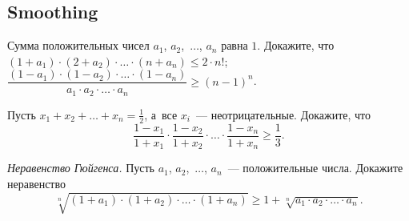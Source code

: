 \subsection*{Smoothing}

\begin{problems}

\item
Сумма положительных чисел $a_1$, $a_2$,~$\ldots$, $a_n$ равна $1$.
Докажите, что
\\[0.3ex]
\sp
\(
    (1 + a_1) \cdot (2 + a_2)
    \cdot \ldots \cdot
    (n + a_n)
\leq
    2 \cdot n!
\)\;;
\\[0.7ex]
\sp
\(
    \dfrac{
        (1 - a_1) \cdot (1 - a_2) \cdot \ldots \cdot (1 - a_n)
    }{
        a_1 \cdot a_2 \cdot \ldots \cdot a_n
    }
\geq
    (n - 1)^n
\)\;.

\item
Пусть $x_1 + x_2 + \ldots + x_n = \frac{1}{2}$, а~все $x_i$~---
неотрицательные.
Докажите, что
\[
    \frac{1 - x_1}{1 + x_1} \cdot \frac{1 - x_2}{1 + x_2}
    \cdot \ldots \cdot
    \frac{1 - x_n}{1 + x_n}\geqslant\frac{1}{3}.
\]

\item\emph{Неравенство Гюйгенса.}
Пусть $a_1$, $a_2$,~$\ldots$, $a_n$~--- положительные числа.
Докажите неравенство
\[
    \sqrt[n]{
        (1 + a_1) \cdot (1 + a_2) \cdot \ldots \cdot (1 + a_n)
    }
\geq
    1 + \sqrt[n]{a_1 \cdot a_2 \cdot \ldots \cdot a_n}
.\]

\end{problems}

